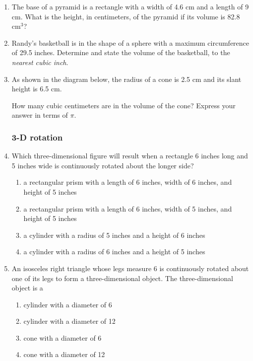 \documentclass[12pt, oneside]{article}
\begin{document}
\begin{enumerate}[itemsep=0cm]
\item The base of a pyramid is a rectangle with a width of 4.6 cm and a
length of 9 cm. What is the height, in centimeters, of the pyramid if
its volume is 82.8 cm$^3$?

\item Randy's basketball is in the shape of a sphere with a maximum circumference of 29.5 inches. Determine and state the volume of the basketball, to the \emph{nearest cubic inch}.

\item As shown in the diagram below, the radius of a cone is 2.5 cm and its slant height is 6.5 cm.
  \begin{center}
  \end{center}
How many cubic centimeters are in the volume of the cone? Express your answer in terms of $\pi$.


\subsubsection*{3-D rotation}
\item Which three-dimensional figure will result when a rectangle 6 inches long and 5 inches wide is continuously rotated about the longer side?
\begin{enumerate}
  \item a rectangular prism with a length of 6 inches, width of 6 inches, and height of 5 inches
  \item a rectangular prism with a length of 6 inches, width of 5 inches, and height of 5 inches
  \item a cylinder with a radius of 5 inches and a height of 6 inches
  \item a cylinder with a radius of 6 inches and a height of 5 inches
\end{enumerate}

\item An isosceles right triangle whose legs measure 6 is continuously rotated about one of its legs to form a three-dimensional object. The three-dimensional object is a
  \begin{enumerate}
    \item cylinder with a diameter of 6
    \item cylinder with a diameter of 12
    \item cone with a diameter of 6
    \item cone with a diameter of 12
  \end{enumerate}


\end{enumerate}
\end{document}
